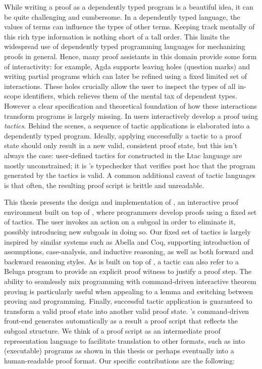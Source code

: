 While writing a proof as a dependently typed program is a beautiful idea, it
can be quite challenging and cumbersome.
In a dependently typed language, the values of terms can influence the types of
other terms.
Keeping track mentally of this rich type information is nothing short of a tall
order.
This limits the widespread use of dependently typed programming languages for
mechanizing proofs in general.
Hence, many proof assistants in this domain provide some form
of interactivity: for example, Agda \cite{Norell:phd07} supports leaving holes
(question marks) and writing partial programs which can later be refined using a
fixed limited set of interactions.
These holes crucially allow the user to inspect the types of all in-scope
identifiers, which relieves them of the mental tax of dependent types.
However a clear specification and theoretical foundation of how these
interactions transform programs is largely missing.
In \Coq{} \cite{bertot/casteran:2004} users interactively develop a proof using
\emph{tactics}.
Behind the scenes, a sequence of tactic applications is elaborated into a
dependently typed program.
Ideally, applying successfully a tactic to a proof state should only result in a
new valid, consistent proof state, but this isn't always the case: user-defined
tactics for \Coq{} constructed in the Ltac language \cite{Delahaye:LPAR00} are
mostly unconstrained; it is \Coq's typechecker that verifies post hoc that the
program generated by the tactics is valid.
A common additional caveat of tactic languages is that often, the resulting
proof script is brittle and unreadable.

This thesis presents the design and implementation of \Harpoon, an
interactive proof environment built on top of \Beluga, where programmers develop
proofs using a fixed set of tactics.
The user invokes an action on a subgoal in order to eliminate it, possibly
introducing new subgoals in doing so.
Our fixed set of tactics is largely inspired by similar systems such as
Abella \cite{Gacek:IJCAR08} and Coq, supporting introduction of assumptions,
case-analysis, and inductive reasoning, as well as both forward and backward
reasoning styles.
As \Harpoon{} is built on top of \Beluga{}, a tactic can also refer to a
Beluga{} program to provide an explicit proof witness to justify a proof step.
The ability to seamlessly mix programming with command-driven interactive
theorem proving is particularly useful when appealing to a lemma and switching
between proving and programming.
Finally, successful tactic application is guaranteed to transform a valid proof
state into another valid proof state.
%
\Harpoon's command-driven front-end generates automatically as a result a proof
script that reflects the subgoal structure.
We think of a proof script as an intermediate proof representation language to
facilitate translation to other formats, such as into (executable) \Beluga{}
programs as shown in this thesis or perhaps eventually into a human-readable
proof format. Our specific contributions are the following:

